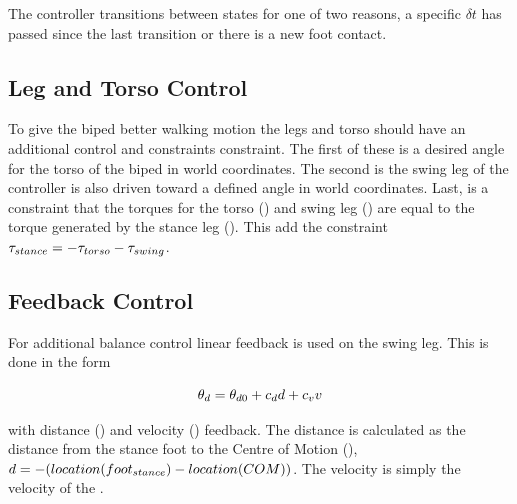 The controller transitions between states for one of two reasons, a specific $\delta t$ has passed since the last transition or there is a new foot contact.


\subsection{Leg and Torso Control}

To give the biped better walking motion the legs and torso should have an additional control and constraints constraint. 
The first of these is a desired angle for the torso of the biped in world coordinates.
The second is the swing leg of the controller is also driven toward a defined angle in world coordinates.
Last, is a constraint that the torques for the torso (\torqueTorso) and swing leg (\torqueSwing) are equal to the torque generated by the stance leg (\torqueStance). 
This add the constraint $\tau_{stance} = -\tau_{torso} - \tau_{swing}$.

\subsection{Feedback Control}

For additional balance control linear feedback is used on the swing leg. This is done in the form

\begin{equation}
\label{equation:feedback-law}
	\theta_{d} = \theta_{d0} + c_{d} d + c_{v} v
\end{equation}

with distance (\distance) and velocity (\velocity) feedback.
The distance \distance is calculated as the distance from the stance foot to the Centre of Motion (\COM), $d = -(location(foot_{stance}) - location(COM))$.
The velocity \velocity is simply the velocity of the \COM.

